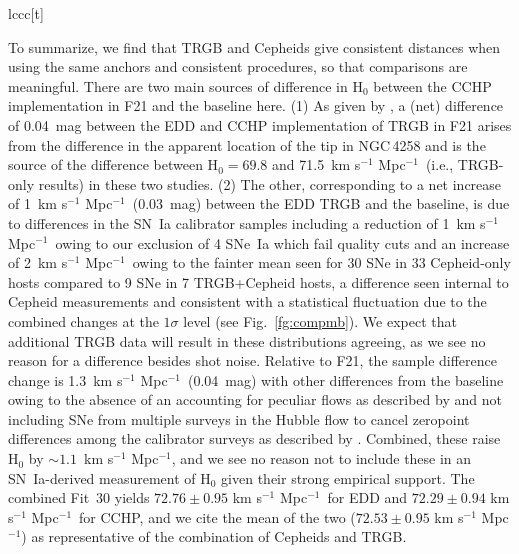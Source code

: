 \documentclass[12pt]{aastex631}
\newcommand{\kms}{km s$^{-1}$ Mpc$^{-1}$}
\newcommand{\kmss }{km s$^{-1}$ Mpc$^{-1}$\ }
\newcommand{\hwtrgb}{$ 72.76 \pm 0.95 $ km s$^{-1}$ Mpc$^{-1}$}
\newcommand{\hwtrgbcchp}{$ 72.29 \pm 0.94 $ km s$^{-1}$ Mpc$^{-1}$}
\newcommand{\hwtrgbmean}{$ 72.53 \pm 0.95 $ km s$^{-1}$ Mpc$^{-1}$}
\begin{document}
\begin{deluxetable}{lccc}[t]
\label{tab:magDifferences}
\end{deluxetable}
      
To summarize, we find that TRGB and Cepheids give consistent distances when using the same anchors and consistent procedures, so that comparisons are meaningful.  There are two main sources of difference in H$_0$ between the CCHP implementation in F21 and the baseline here. 
(1) As given by \citet{Anand:2021}, a (net) difference of 0.04~mag between the EDD and CCHP implementation of TRGB in F21 arises from the difference in the apparent location of the tip in NGC$\,$4258 and is the source of the difference between H$_0 = 69.8$ and 71.5~\kmss (i.e., TRGB-only results) in these two studies. (2) The other, corresponding to a net increase of 1~\kmss (0.03~mag) between the EDD TRGB and the baseline, is due to differences in the SN~Ia calibrator samples including a reduction of 1~\kmss owing to our exclusion of 4 SNe~Ia which fail quality cuts and an increase of 2~\kmss owing to the fainter mean seen for 30 SNe in 33 Cepheid-only hosts compared to 9 SNe in 7 TRGB+Cepheid hosts, a difference seen internal to Cepheid measurements and consistent with a statistical fluctuation due to the combined changes at the $1\sigma$ level (see Fig.~\ref{fg:compmb}). We expect that additional TRGB data will result in these distributions agreeing, as we see no reason for a difference besides shot noise. Relative to F21, the sample difference change is 1.3~\kmss (0.04~mag) with other differences from the baseline owing to the absence of an accounting for peculiar flows as described by \citet{Peterson:2021} and not including SNe from multiple surveys in the Hubble flow to cancel zeropoint differences among the calibrator surveys as described by \citet{Brownsberger:2021}. Combined, these raise H$_0$ by $\sim 1.1$~\kms, and we see no reason not to include these in an SN~Ia-derived measurement of H$_0$ given their strong empirical support.  The combined Fit~30 yields \hwtrgb\ for EDD and \hwtrgbcchp\ for CCHP, and we cite the mean of the two (\hwtrgbmean) as representative of the combination of Cepheids and TRGB.
\end{document}
